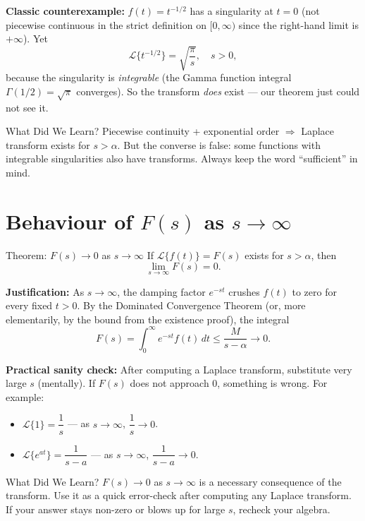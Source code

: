 \documentclass[12pt,a4paper]{article}
\begin{document}
\textbf{Classic counterexample:} $f(t) = t^{-1/2}$ has a singularity at $t = 0$ (not piecewise continuous in the strict definition on $[0, \infty)$ since the right-hand limit is $+\infty$). Yet
\[
  \mathcal{L}\{t^{-1/2}\} = \sqrt{\frac{\pi}{s}}, \quad s > 0,
\]
because the singularity is \emph{integrable} (the Gamma function integral $\Gamma(1/2) = \sqrt{\pi}$ converges). So the transform \emph{does} exist --- our theorem just could not see it.

\begin{learnbox}{What Did We Learn?}
Piecewise continuity + exponential order $\Rightarrow$ Laplace transform exists for $s > \alpha$. But the converse is false: some functions with integrable singularities also have transforms. Always keep the word ``sufficient'' in mind.
\end{learnbox}

\section{Behaviour of $F(s)$ as $s \to \infty$}

\begin{infobox}{Theorem: $F(s) \to 0$ as $s \to \infty$}
If $\mathcal{L}\{f(t)\} = F(s)$ exists for $s > \alpha$, then
\[
  \lim_{s \to \infty} F(s) = 0.
\]
\end{infobox}

\textbf{Justification:} As $s \to \infty$, the damping factor $e^{-st}$ crushes $f(t)$ to zero for every fixed $t > 0$. By the Dominated Convergence Theorem (or, more elementarily, by the bound from the existence proof), the integral
\[
  F(s) = \int_0^{\infty} e^{-st} f(t)\, dt \leq \frac{M}{s - \alpha} \to 0.
\]

\textbf{Practical sanity check:} After computing a Laplace transform, substitute very large $s$ (mentally). If $F(s)$ does not approach 0, something is wrong. For example:
\begin{itemize}
  \item $\mathcal{L}\{1\} = \dfrac{1}{s}$ --- as $s \to \infty$, $\dfrac{1}{s} \to 0$. \checkmark
  \item $\mathcal{L}\{e^{at}\} = \dfrac{1}{s-a}$ --- as $s \to \infty$, $\dfrac{1}{s-a} \to 0$. \checkmark
\end{itemize}

\begin{learnbox}{What Did We Learn?}
$F(s) \to 0$ as $s \to \infty$ is a necessary consequence of the transform. Use it as a quick error-check after computing any Laplace transform. If your answer stays non-zero or blows up for large $s$, recheck your algebra.
\end{learnbox}
\end{document}
